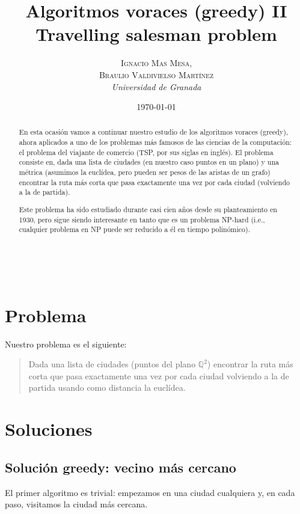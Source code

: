 \documentclass[a4paper, 11pt]{article}
\title{\textbf{Algoritmos voraces (greedy) II}\\ %
Travelling salesman problem} %
\author{\textsc{Ignacio Mas Mesa,\\Braulio Valdivielso Martínez} %
\\{\textit{Universidad de Granada}}} %
\date{\today} %
\makeatletter
\renewcommand{\maketitle}{
  \begin{flushright} %
  
  {\LARGE\@title} %
  
  \vspace{50pt} %
  
  {\large\@author} %
  \\\@date %
  \vspace{40pt} %
  \end{flushright}
}
\makeatother
\begin{document}
\maketitle %

\renewcommand{\abstractname}{Abstract} %
\begin{abstract}
En esta ocasión vamos a continuar nuestro estudio de los algoritmos voraces (greedy), ahora aplicados a uno de los problemas más famosos de las ciencias de la computación: el problema del viajante de comercio (TSP, por sus siglas en inglés). El problema consiste en, dada una lista de ciudades (en nuestro caso puntos en un plano) y una métrica (asumimos la euclídea, pero pueden ser pesos de las aristas de un grafo) encontrar la ruta más corta que pasa exactamente una vez por cada ciudad (volviendo a la de partida).

Este problema ha sido estudiado durante casi cien años desde su planteamiento en 1930, pero sigue siendo interesante en tanto que es un problema NP-hard (i.e., cualquier problema en NP puede ser reducido a él en tiempo polinómico).
\end{abstract}

\vspace{30pt} %


  \tableofcontents

\pagebreak


\section{Problema}
Nuestro problema es el siguiente:
\begin{quote}
Dada una lista de ciudades (puntos del plano ${\mathbb Q}^2$) encontrar la ruta más corta que pasa exactamente una vez por cada ciudad volviendo a la de partida usando como distancia la euclídea.
\end{quote}

\section{Soluciones}
\subsection{Solución greedy: vecino más cercano}
El primer algoritmo es trivial: empezamos en una ciudad cualquiera y, en cada paso, visitamos la ciudad más cercana.
\end{document}
